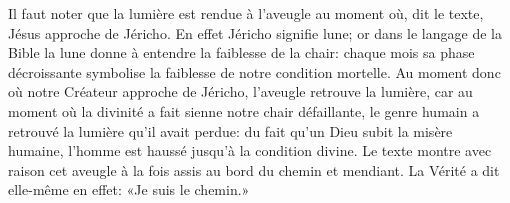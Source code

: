 Il faut noter que la lumière est rendue à l'aveugle
		au moment où, dit le texte, Jésus approche de Jéricho.
En effet Jéricho signifie lune;
	or dans le langage de la Bible la lune donne à entendre la faiblesse de la chair:
	chaque mois sa phase décroissante symbolise la faiblesse de notre condition mortelle.
Au moment donc où notre Créateur approche de Jéricho, l'aveugle retrouve la lumière,
	car au moment où la divinité a fait sienne notre chair défaillante,
		le genre humain a retrouvé la lumière qu'il avait perdue:
	du fait qu'un Dieu subit la misère humaine,
		l'homme est haussé jusqu'à la condition divine.
Le texte montre avec raison cet aveugle à la fois assis au bord du chemin et mendiant.
La Vérité a dit elle-même en effet: «Je suis le chemin.»
